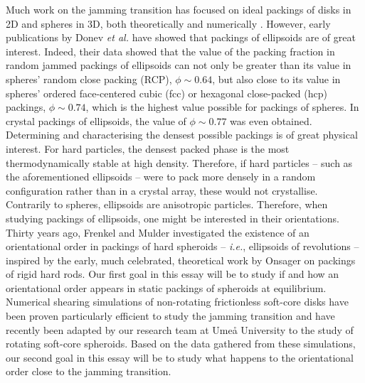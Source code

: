 \documentclass[class=report, float=false, crop=false]{standalone}
\begin{document}
Much work on the jamming transition has focused on ideal packings of disks in 2D and spheres in 3D, both theoretically \cite{PRL106.135702} and numerically \cite{PRL99.178001,PRE83.031307}. However, early publications by Donev \textit{et al.} \cite{donev2004improving,PRL94.198001} have showed that packings of ellipsoids are of great interest. Indeed, their data showed that the value of the packing fraction in random jammed packings of ellipsoids can not only be greater than its value in spheres' random close packing (RCP), $\phi\sim0.64$, but also close to its value in spheres' ordered face-centered cubic (fcc) or hexagonal close-packed (hcp) packings, $\phi\sim0.74$, which is the highest value possible for packings of spheres. In crystal packings of ellipsoids, the value of $\phi\sim0.77$ was even obtained. \cite{donev2004unusually} Determining and characterising the densest possible packings is of great physical interest. For hard particles, the densest packed phase is the most thermodynamically stable at high density. Therefore, if hard particles -- such as the aforementioned ellipsoids -- were to pack more densely in a random configuration rather than in a crystal array, these would not crystallise. \cite{chaikin2006some}\\

Contrarily to spheres, ellipsoids are anisotropic particles. Therefore, when studying packings of ellipsoids, one might be interested in their orientations. Thirty years ago, Frenkel and Mulder investigated the existence of an orientational order in packings of hard spheroids \cite{frenkel1985hard} -- \textit{i.e.}, ellipsoids of revolutions -- inspired by the early, much celebrated, theoretical work by Onsager on packings of rigid hard rods. \cite{onsager1949effects} Our first goal in this essay will be to study if and how an orientational order appears in static packings of spheroids at equilibrium.\\

Numerical shearing simulations of non-rotating frictionless soft-core disks have been proven particularly efficient to study the jamming transition \cite{PRL99.178001,PRE83.031307} and have recently been adapted by our research team at Umeå University to the study of rotating soft-core spheroids. Based on the data gathered from these simulations, our second goal in this essay will be to study what happens to the orientational order close to the jamming transition.

% 
\end{document}
